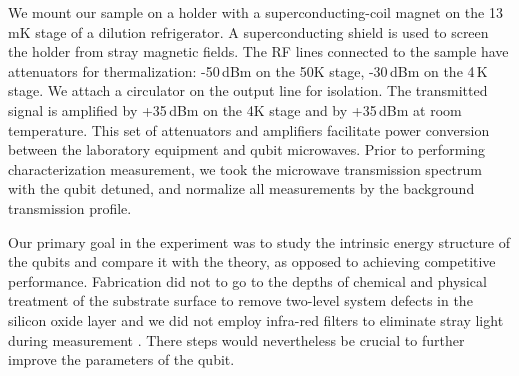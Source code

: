


We mount our sample on a holder with a superconducting-coil magnet on the 13\,mK
stage of  a dilution refrigerator.  A  superconducting shield is used  to screen
the holder  from stray magnetic  fields.  The RF  lines connected to  the sample
have attenuators for thermalization: -50\,dBm on  the 50K stage, -30\,dBm on the
4\,K  stage.  We  attach a  circulator on  the output  line for  isolation.  The
transmitted signal is amplified  by +35\,dBm on the 4K stage  and by +35\,dBm at
room  temperature.  This  set  of attenuators  and  amplifiers facilitate  power
conversion  between the  laboratory equipment  and qubit  microwaves.  Prior  to
performing  characterization measurement,  we  took  the microwave  transmission
spectrum with the qubit detuned, and  normalize all measurements by the background
transmission profile.

Our primary goal  in the experiment was to study  the intrinsic energy structure
of  the  qubits  and  compare  it  with the  theory,  as  opposed  to  achieving
competitive performance. Fabrication did not to go to the depths of chemical and
physical treatment of  the substrate surface to remove  two-level system defects
in the  silicon oxide layer \cite{earnest2018}  and we did not  employ infra-red
filters to  eliminate stray  light during measurement  \cite{barends2011}. There
steps would nevertheless be crucial to further improve the parameters of the
qubit.

